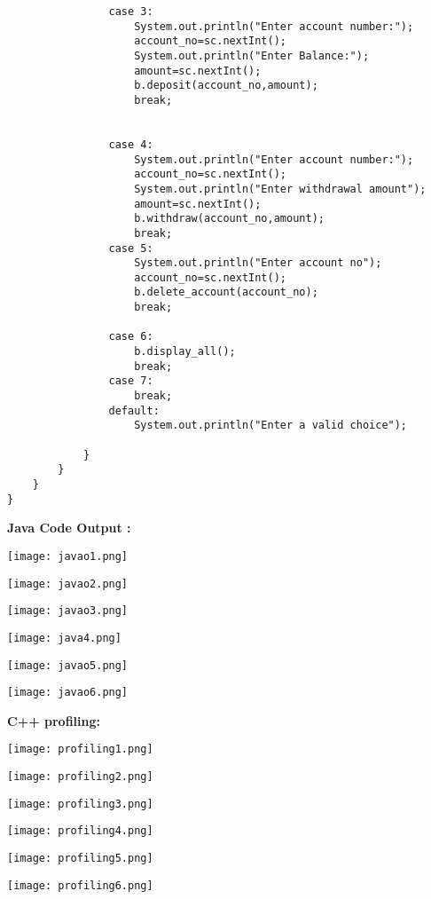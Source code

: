 \documentclass[11pt, a4paper]{article}
\begin{document}
\begin{lstlisting}
                case 3:
                    System.out.println("Enter account number:");
                    account_no=sc.nextInt();
                    System.out.println("Enter Balance:");
                    amount=sc.nextInt();
                    b.deposit(account_no,amount);
                    break;


                case 4:
                    System.out.println("Enter account number:");
                    account_no=sc.nextInt();
                    System.out.println("Enter withdrawal amount");
                    amount=sc.nextInt();
                    b.withdraw(account_no,amount);
                    break;
                case 5:
                    System.out.println("Enter account no");
                    account_no=sc.nextInt();
                    b.delete_account(account_no);
                    break;

                case 6:
                    b.display_all();
                    break;
                case 7:
                    break;
                default:
                    System.out.println("Enter a valid choice");

            }
        }
    }
}
\end{lstlisting}
\newpage
    \textbf{ Java Code Output :}
\vspace{0.8cm}
\begin{center}
    \texttt{[image: javao1.png]}
\end{center}
\begin{center}
    \texttt{[image: javao2.png]}
\end{center}
\begin{center}
    \texttt{[image: javao3.png]}
\end{center}
\begin{center}
    \texttt{[image: java4.png]}
\end{center}
\begin{center}
    \texttt{[image: javao5.png]}
\end{center}
\begin{center}
    \texttt{[image: javao6.png]}
\end{center}
\newpage
\textbf{ C++ profiling:}
\vspace{0.8cm}
\\
\begin{center}
    \texttt{[image: profiling1.png]}
\end{center}
\begin{center}
    \texttt{[image: profiling2.png]}
\end{center}
\begin{center}
    \texttt{[image: profiling3.png]}
\end{center}

\begin{center}
    \texttt{[image: profiling4.png]}
\end{center}
\begin{center}
    \texttt{[image: profiling5.png]}
\end{center}
\begin{center}
    \texttt{[image: profiling6.png]}
\end{center}
\\\\
\hline
{}
\end{document}
